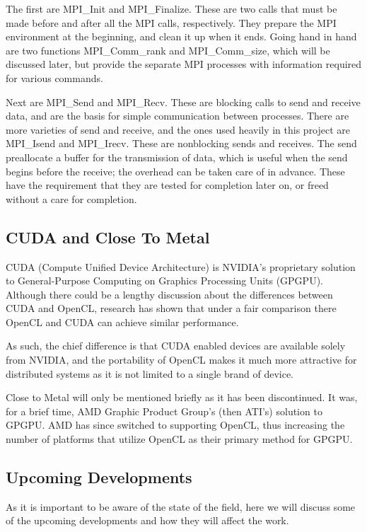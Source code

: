 \documentclass[../thesis.tex]{subfiles}
\begin{document}
        The first are MPI\_Init and MPI\_Finalize. These are two calls that must be made before and after all the MPI calls, respectively. They prepare the MPI environment at the beginning, and clean it up when it ends. Going hand in hand are two functions MPI\_Comm\_rank and MPI\_Comm\_size, which will be discussed later, but provide the separate MPI processes with information required for various commands.

        Next are MPI\_Send and MPI\_Recv. These are blocking calls to send and receive data, and are the basis for simple communication between processes. There are more varieties of send and receive, and the ones used heavily in this project are MPI\_Isend and MPI\_Irecv. These are nonblocking sends and receives. The send preallocate a buffer for the transmission of data, which is useful when the send begins before the receive; the overhead can be taken care of in advance. These have the requirement that they are tested for completion later on, or freed without a care for completion.
    
    \subsection{CUDA and Close To Metal} %
    \label{sub:cuda_and_close_to_metal}
        CUDA (Compute Unified Device Architecture) is NVIDIA's proprietary solution to General-Purpose Computing on Graphics Processing Units (GPGPU). Although there could be a lengthy discussion about the differences between CUDA and OpenCL, research has shown that under a fair comparison there OpenCL and CUDA can achieve similar performance\cite{6047190}.

        As such, the chief difference is that CUDA enabled devices are available solely from NVIDIA\cite{cudagpus}, and the portability of OpenCL makes it much more attractive for distributed systems as it is not limited to a single brand of device.

        Close to Metal will only be mentioned briefly as it has been discontinued. It was, for a brief time, AMD Graphic Product Group's (then ATI's) solution to GPGPU. AMD has since switched to supporting OpenCL, thus increasing the number of platforms that utilize OpenCL as their primary method for GPGPU.


    \subsection{Upcoming Developments} %
    \label{sub:upcoming_developments}
    As it is important to be aware of the state of the field, here we will discuss some of the upcoming developments and how they will affect the work.
\end{document}
